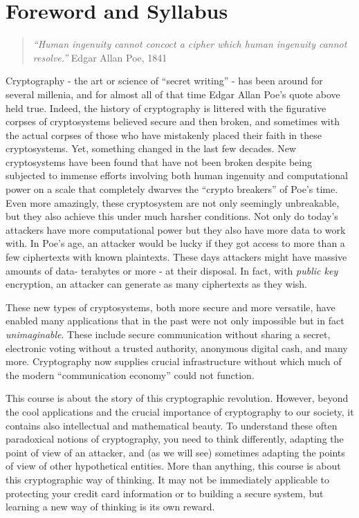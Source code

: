 \chapter{Foreword and Syllabus}\label{p-Foreword-and-Syllabus}

\begin{quote}
\emph{``Human ingenuity cannot concoct a cipher which human ingenuity
cannot resolve.''} Edgar Allan Poe, 1841
\end{quote}

Cryptography - the art or science of ``secret writing'' - has been
around for several millenia, and for almost all of that time Edgar Allan
Poe's quote above held true. Indeed, the history of cryptography is
littered with the figurative corpses of cryptosystems believed secure
and then broken, and sometimes with the actual corpses of those who have
mistakenly placed their faith in these cryptosystems. Yet, something
changed in the last few decades. New cryptosystems have been found that
have not been broken despite being subjected to immense efforts
involving both human ingenuity and computational power on a scale that
completely dwarves the ``crypto breakers'' of Poe's time. Even more
amazingly, these cryptosystem are not only seemingly unbreakable, but
they also achieve this under much harsher conditions. Not only do
today's attackers have more computational power but they also have more
data to work with. In Poe's age, an attacker would be lucky if they got
access to more than a few ciphertexts with known plaintexts. These days
attackers might have massive amounts of data- terabytes or more - at
their disposal. In fact, with \emph{public key} encryption, an attacker
can generate as many ciphertexts as they wish.

These new types of cryptosystems, both more secure and more versatile,
have enabled many applications that in the past were not only impossible
but in fact \emph{unimaginable}. These include secure communication
without sharing a secret, electronic voting without a trusted authority,
anonymous digital cash, and many more. Cryptography now supplies crucial
infrastructure without which much of the modern ``communication
economy'' could not function.

This course is about the story of this cryptographic revolution.
However, beyond the cool applications and the crucial importance of
cryptography to our society, it contains also intellectual and
mathematical beauty. To understand these often paradoxical notions of
cryptography, you need to think differently, adapting the point of view
of an attacker, and (as we will see) sometimes adapting the points of
view of other hypothetical entities. More than anything, this course is
about this cryptographic way of thinking. It may not be immediately
applicable to protecting your credit card information or to building a
secure system, but learning a new way of thinking is its own reward.

